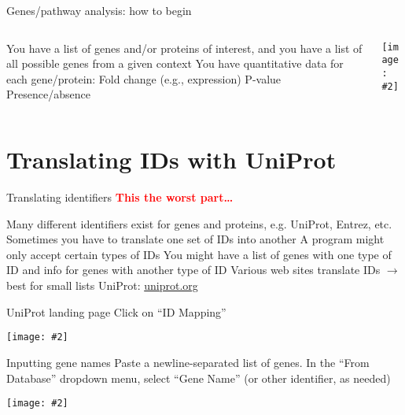 \documentclass{beamer}
\renewcommand{\c}[1]{\begin{center}#1\end{center}}
\newcommand{\red}[1]{\textcolor{red}{\textbf{#1}}}
\newcommand{\gr}[2][.95]{\c{\texttt{[image: \#2]}}}
\begin{document}
\begin{frame}{Genes/pathway analysis: how to begin}
\begin{columns}
    \begin{column}{0.7\textwidth}
        \begin{outline}
            \1 You have a list of genes and/or proteins of interest, and you have a list of all possible genes from a given context
            \1 You have quantitative data for each gene/protein:
                \2 Fold change (e.g., expression)
                \2 P-value
                \2 Presence/absence
        \end{outline}
    \end{column}
    \begin{column}{0.3\textwidth}
         \gr{l7_figs/s5_unique_low_genes.png}
    \end{column}
\end{columns}
\end{frame}

\section{Translating IDs with UniProt}

\begin{frame}{Translating identifiers}
    \red{This the worst part\ldots}

    \begin{outline}
        \1[] Many different identifiers exist for genes and proteins, e.g. UniProt, Entrez, etc. 
        \1[] Sometimes you have to translate one set of IDs into another
            \2 A program might only accept certain types of IDs 
            \2 You might have a list of genes with one type of ID and info for genes with another type of ID
        \1[] Various web sites translate IDs $\to$ best for small lists
            \2 UniProt: \href{https://www.uniprot.org}{uniprot.org}
    \end{outline}
\end{frame}

\begin{frame}{UniProt landing page}
    Click on ``ID Mapping''
    \gr[0.8]{l7_figs/uniprot1.png}
\end{frame}

\begin{frame}{Inputting gene names}
    Paste a newline-separated list of genes. In the ``From Database'' dropdown menu, select ``Gene Name'' (or other identifier, as needed)
    \gr[0.5]{l7_figs/uniprot2.png}
\end{frame}
\end{document}
